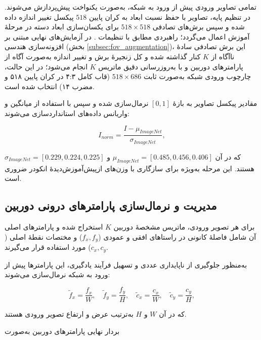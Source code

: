 تمامی تصاویر ورودی پیش از ورود به شبکه، به‌صورت یکنواخت پیش‌پردازش می‌شوند. در تنظیم پایه، تصاویر با حفظ نسبت ابعاد به کران پایین $518$ پیکسل تغییر اندازه داده شده و سپس برش‌های تصادفی $518 \times 518$ برای یکسان‌سازی ابعاد دسته در مرحلهٔ آموزش اعمال می‌گردد؛ راهبردی مطابق با تنظیمات \basemodel{} \cite{DepthAnythingV2}. در آزمایش‌های نهایی مبتنی بر افزونه‌سازی هندسی (بخش \ref{subsec:fov_augmentation})، این برش تصادفی سادهٔ ناآگاه از $K$ کنار گذاشته شده و کل زنجیرهٔ برش و تغییر اندازه به‌صورت آگاه از پارامترهای دوربین و با به‌روزرسانی دقیق ماتریس $K$ انجام می‌شود؛ در این حالت، چارچوب ورودی شبکه به‌صورت ثابت $518 \times 686$ (قاب کامل ۴:۳ در کران پایین ۵۱۸ و مضرب ۱۴) انتخاب شده است.

مقادیر پیکسل تصاویر به بازهٔ $[0,1]$ نرمال‌سازی شده و سپس با استفاده از میانگین و واریانس داده‌های  استانداردسازی می‌شوند:

\begin{equation}
I_{norm} = \frac{I - \mu_{ImageNet}}{\sigma_{ImageNet}},
\end{equation}

که در آن $\mu_{ImageNet} = [0.485, 0.456, 0.406]$ و $\sigma_{ImageNet} = [0.229, 0.224, 0.225]$ هستند. این مرحله به‌ویژه برای سازگاری با وزن‌های ازپیش‌آموزش‌دیدهٔ انکودر  ضروری است.
\subsection{مدیریت و نرمال‌سازی پارامترهای درونی دوربین}

برای هر تصویر ورودی، ماتریس مشخصهٔ دوربین $K$ استخراج شده و پارامترهای اصلی آن شامل فاصلهٔ کانونی در راستاهای افقی و عمودی ($f_x, f_y$) و مختصات نقطهٔ اصلی ($c_x, c_y$) مورد استفاده قرار می‌گیرند.

به‌منظور جلوگیری از ناپایداری عددی و تسهیل فرآیند یادگیری، این پارامترها پیش از ورود به شبکه نرمال‌سازی می‌شوند:

\begin{equation}
\tilde{f}_x = \frac{f_x}{W}, \quad
\tilde{f}_y = \frac{f_y}{H}, \quad
\tilde{c}_x = \frac{c_x}{W}, \quad
\tilde{c}_y = \frac{c_y}{H},
\end{equation}

که در آن $W$ و $H$ به‌ترتیب عرض و ارتفاع تصویر ورودی هستند.

بردار نهایی پارامترهای دوربین به‌صورت

